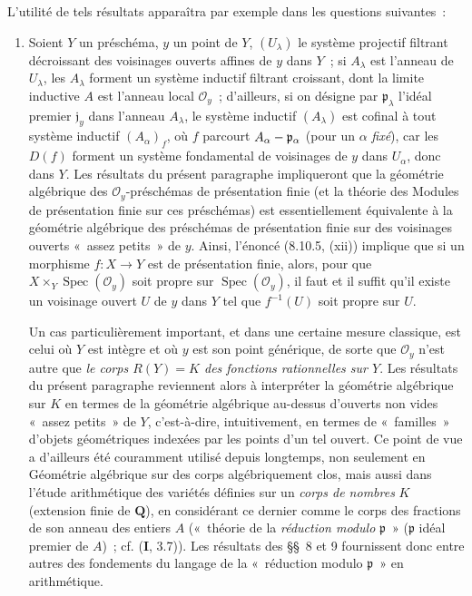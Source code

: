 \begin{env}[8.1.2]
L'utilité de tels résultats apparaîtra par exemple dans les questions
suivantes~:
\begin{enumerate}
\item[\emph{a)}] Soient $Y$ un préschéma, $y$ un point de $Y$, $(U_\lambda)$
le système projectif filtrant décroissant des voisinages ouverts affines de
$y$ dans $Y$~; si $A_\lambda$ est l'anneau de $U_\lambda$, les $A_\lambda$
forment un système inductif filtrant croissant, dont la limite inductive $A$
est l'anneau local $\mathcal O_y$~; d'ailleurs, si on désigne par
$\mathfrak p_\lambda$ l'idéal premier $\mathfrak j_y$ dans l'anneau
$A_\lambda$, le système inductif $(A_\lambda)$ est cofinal à tout système
inductif $(A_\alpha)_f$, où $f$ parcourt
$A_\alpha-\mathfrak p_\alpha$ (pour un $\alpha$ \emph{fixé}), car les $D(f)$
forment un système fondamental de voisinages de $y$ dans $U_\alpha$,
donc dans $Y$. Les résultats du présent paragraphe impliqueront que la
géométrie algébrique des $\mathcal O_y$-préschémas de présentation finie (et
la théorie des Modules de présentation finie sur ces préschémas) est
essentiellement équivalente à la géométrie algébrique des préschémas de
présentation finie sur des voisinages ouverts «~assez petits~» de $y$. Ainsi,
l'énoncé (8.10.5, (xii)) implique que si un morphisme $f:X\to Y$ est de
présentation finie, alors, pour que
$X\times_Y\operatorname{Spec}(\mathcal O_y)$ soit propre sur
$\operatorname{Spec}(\mathcal O_y)$, il faut et il suffit qu'il existe un
voisinage ouvert $U$ de $y$ dans $Y$ tel que $f^{-1}(U)$ soit propre sur $U$.

Un cas particulièrement important, et dans une certaine mesure classique,
est celui où $Y$ est intègre et où $y$ est son point générique, de sorte que
$\mathcal O_y$ n'est autre que \emph{le corps $R(Y)=K$ des fonctions
rationnelles sur $Y$}. Les résultats du présent paragraphe reviennent alors à
interpréter la géométrie algébrique sur $K$ en termes de la géométrie
algébrique au-dessus d'ouverts non vides «~assez petits~» de $Y$, c'est-à-dire,
intuitivement, en termes de «~familles~» d'objets géométriques indexées par les
points d'un tel ouvert. Ce point de vue a d'ailleurs été couramment utilisé
depuis longtemps, non seulement en Géométrie algébrique sur des corps
algébriquement clos, mais aussi dans l'étude arithmétique des variétés définies
sur un \emph{corps de nombres} $K$ (extension finie de $\mathbf Q$), en
considérant ce dernier comme le corps des fractions de son anneau des entiers
$A$ («~théorie de la \emph{réduction modulo} $\mathfrak p$~» ($\mathfrak p$
idéal premier de $A$)~; cf. (\textbf{I}, 3.7)). Les résultats des \S\S~8 et 9
fournissent donc entre autres des fondements du langage de la «~réduction
modulo $\mathfrak p$~» en arithmétique.


\end{enumerate}
\end{env}
